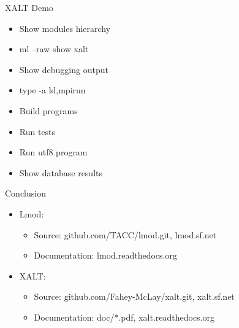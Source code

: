 \documentclass{beamer}
\begin{document}
\begin{frame}{XALT Demo}
  \begin{itemize}
    \item Show modules hierarchy
    \item ml --raw show xalt
    \item Show debugging output
    \item type -a {ld,mpirun}
    \item Build programs
    \item Run tests
    \item Run utf8 program
    \item Show database results
  \end{itemize}
\end{frame}

\begin{frame}{Conclusion}
  \begin{itemize}
    \item Lmod:
      \begin{itemize}
        \item Source: github.com/TACC/lmod.git, lmod.sf.net
        \item Documentation: lmod.readthedocs.org
      \end{itemize}
    \item XALT:
      \begin{itemize}
        \item Source: github.com/Fahey-McLay/xalt.git, xalt.sf.net
        \item Documentation: doc/*.pdf, xalt.readthedocs.org
      \end{itemize}
  \end{itemize}
\end{frame}
\end{document}

